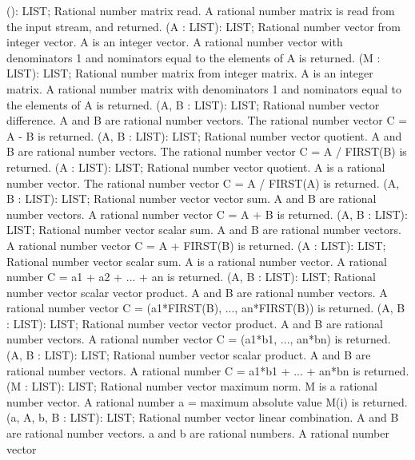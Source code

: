  (): LIST; \eproc
\bcom Rational number matrix read. A rational number matrix is
read from the input stream, and returned.  \ecom 
{} (A : LIST): LIST; \eproc
\bcom Rational number vector from integer vector. A is an integer
vector. A rational number vector with denominators 1 
and nominators equal to the elements of A is returned.  \ecom 
{} (M : LIST): LIST; \eproc
\bcom Rational number matrix from integer matrix. A is an integer
matrix. A rational number matrix with denominators 1 
and nominators equal to the elements of A is returned.  \ecom 
{} (A, B : LIST): LIST; \eproc
\bcom Rational number vector difference. A and B are rational number
vectors. The rational number vector C = A - B is returned.  \ecom 
{} (A, B : LIST): LIST; \eproc
\bcom Rational number vector quotient. A and B are rational number vectors.
The rational number vector C = A / FIRST(B) is returned.  \ecom 
{} (A : LIST): LIST; \eproc
\bcom Rational number vector quotient. A is a rational number vector.
The rational number vector C = A / FIRST(A) is returned.  \ecom 
{} (A, B : LIST): LIST; \eproc
\bcom Rational number vector vector sum. A and B are rational number vectors.
A rational number vector C = A + B is returned.  \ecom 
{} (A, B : LIST): LIST; \eproc
\bcom Rational number vector scalar sum. A and B are rational number vectors.
A rational number vector C = A + FIRST(B) is returned.  \ecom 
{} (A : LIST): LIST; \eproc
\bcom Rational number vector scalar sum. A is a rational number vector.
A rational number C = a1 + a2 + ... + an is returned.  \ecom 
{} (A, B : LIST): LIST; \eproc
\bcom Rational number vector scalar vector product. A and B are
rational number vectors. A rational number vector 
C = (a1*FIRST(B), ..., an*FIRST(B)) is returned.  \ecom 
{} (A, B : LIST): LIST; \eproc
\bcom Rational number vector vector product. A and B are
rational number vectors. A rational number vector 
C = (a1*b1, ..., an*bn) is returned.  \ecom 
{} (A, B : LIST): LIST; \eproc
\bcom Rational number vector scalar product. A and B are rational
number vectors. A rational number C = a1*b1 + ... + an*bn is
returned.  \ecom 
{} (M : LIST): LIST; \eproc
\bcom Rational number vector maximum norm. M is a rational number
vector. A rational number a = maximum absolute value M(i) 
is returned.  \ecom 
{} (a, A, b, B : LIST): LIST; \eproc
\bcom Rational number vector linear combination. A and B are rational
number vectors. a and b are rational numbers. A rational number vector 
